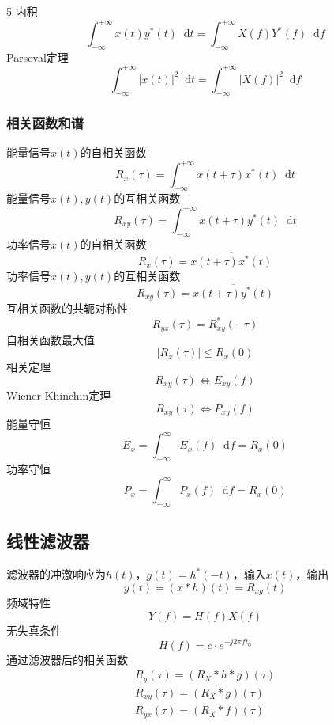 \documentclass[8pt, a4paper]{extarticle}
\newcommand*{\dif}{\mathop{}\!\mathrm{d}}
\begin{document}
\begin{multicols}{5}
内积
\[
\int_{-\infty}^{+\infty}x(t)y^*(t)\dif t = \int_{-\infty}^{+\infty}X(f)Y^*(f)\dif f 
\]
Parseval定理
\[
\int_{-\infty}^{+\infty}|x(t)|^2\dif t = \int_{-\infty}^{+\infty}|X(f)|^2\dif f 
\]
\subsubsection{相关函数和谱}
能量信号\(x(t)\)的自相关函数
\[
R_x(\tau) = \int_{-\infty}^{+\infty}x(t+\tau)x^*(t)\dif t
\]
能量信号\(x(t),y(t)\)的互相关函数
\[
R_{xy}(\tau) = \int_{-\infty}^{+\infty}x(t+\tau)y^*(t)\dif t
\]
功率信号\(x(t)\)的自相关函数
\[
R_x(\tau) = \overline{x(t+\tau)x^*(t)}
\]
功率信号\(x(t),y(t)\)的互相关函数
\[
R_{xy}(\tau) = \overline{x(t+\tau)y^*(t)}
\]
互相关函数的共轭对称性
\[
R_{yx}(\tau)=R_{xy}^*(-\tau)
\]
自相关函数最大值
\[
|R_x(\tau)|\leq R_x(0)
\]
相关定理
\[
R_{xy}(\tau) \Leftrightarrow E_{xy}(f)
\]
Wiener-Khinchin定理
\[
R_{xy}(\tau) \Leftrightarrow P_{xy}(f)
\]
能量守恒
\[
E_x = \int_{-\infty}^{\infty} E_x(f) \dif f = R_x(0)
\]
功率守恒
\[
P_x = \int_{-\infty}^{\infty} P_x(f) \dif f = R_x(0)
\]
\subsection{线性滤波器}
滤波器的冲激响应为\(h(t)\)，\(g(t)=h^*(-t)\)，输入\(x(t)\)，输出
\[
y(t) = (x\ast h)(t)= R_{xg}(t)
\]
频域特性
\[
Y(f)=H(f)X(f)
\]
无失真条件
\[
H(f)=c\cdot e^{-j2\pi ft_0}
\]
通过滤波器后的相关函数
\begin{gather*}
R_y(\tau) = (R_X\ast h \ast g)(\tau)\\
R_{xy}(\tau) = (R_X\ast g)(\tau)\\
R_{yx}(\tau) = (R_X\ast f)(\tau)
\end{gather*}

\end{multicols}
\end{document}
